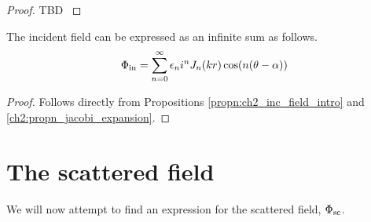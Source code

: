     \begin{proof} TBD \cite[$\S$2.5]{martin06scattering}
    \end{proof}
%
    \begin{propn}\label{propn:ch2_inc_field_infty_sum}
    The incident field can be expressed as an infinite sum as follows.
        \begin{equation*}
            \Phi_{\text{in}} = \sum^{\infty}_{n=0} \epsilon_n i^n J_n(kr) \cos (n(\theta - \alpha))
        \end{equation*}
    \end{propn}
    \begin{proof}
    Follows directly from Propositions \ref{propn:ch2_inc_field_intro} and  \ref{ch2:propn_jacobi_expansion}.
    \end{proof}
\section{The scattered field}\label{ss:scattered_field}
We will now attempt to find an expression for the scattered field, $\Phi_{\text{sc}}$.
